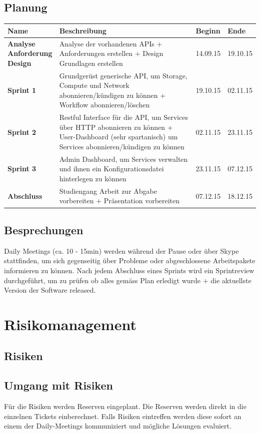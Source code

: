 \subsection{Planung}
\begin{tabularx}{\textwidth}{l X l l}
\textbf{Name} & \textbf{Beschreibung} & \textbf{Beginn} &  \textbf{Ende} \\
\hline
\pbox{3cm}{
\textbf{Analyse}
\\
\textbf{Anforderung}
\\
\textbf{Design} 
}& Analyse der vorhandenen APIs + Anforderungen 
erstellen + Design Grundlagen erstellen & 14.09.15 & 19.10.15\\
\hline
\textbf{Sprint 1} & Grundgerüst generische API, um Storage, Compute und Network 
abonnieren/kündigen zu können
+ Workflow abonnieren/löschen  & 19.10.15 & 02.11.15 \\
\hline
\textbf{Sprint 2} & Restful Interface für die API, um Services über HTTP 
abonnieren zu können + User-Dashboard (sehr spartanisch)  um Services 
abonnieren/kündigen zu können
& 02.11.15 & 23.11.15 \\
\hline
\textbf{Sprint 3} & Admin Dashboard, um Services verwalten 
und ihnen ein Konfigurationsdatei hinterlegen zu können & 23.11.15 & 07.12.15 \\
\hline
\textbf{Abschluss} & Studiengang Arbeit zur Abgabe vorbereiten + Präsentation 
vorbereiten & 07.12.15 & 18.12.15\\
\end{tabularx}

\subsection{Besprechungen}
Daily Meetings (ca. 10 - 15min) werden während der Pause oder über Skype stattfinden, um sich 
gegenseitig über Probleme oder abgeschlossene Arbeitspakete informieren zu können.
Nach jedem Abschluss eines Sprints wird ein Sprintreview durchgeführt, um zu prüfen 
ob alles gemäss Plan erledigt wurde + die aktuellste Version der Software 
released.
\section{Risikomanagement}
\subsection{Risiken}

\subsection{Umgang mit Risiken}
Für die Risiken werden Reserven eingeplant. Die Reserven werden direkt in die einzelnen Tickets 
einberechnet. Falls Risiken eintreffen werden diese sofort an einem der Daily-Meetings kommuniziert 
und mögliche Lösungen evaluiert.
